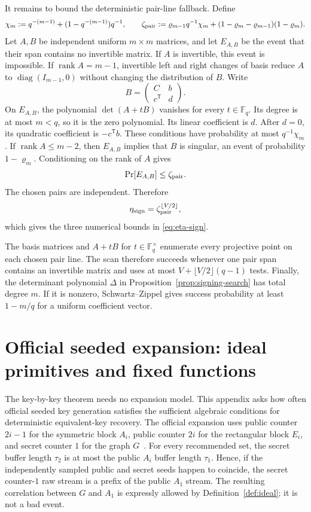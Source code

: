 \documentclass[11pt,a4paper]{article}
\theoremstyle{definition}
\theoremstyle{remark}
\newcommand{\F}{\mathbb F}
\newcommand{\rank}{\operatorname{rank}}
\begin{document}
It remains to bound the deterministic pair-line fallback.  Define
\begin{equation}\label{eq:app-pair-failure}
 \chi_m:=q^{-(m-1)}+(1-q^{-(m-1)})q^{-1},
 \qquad
 \zeta_{\rm pair}
 :=\varrho_{m-1}q^{-1}\chi_m
 +(1-\varrho_m-\varrho_{m-1})(1-\varrho_m).
\end{equation}
Let $A,B$ be independent uniform $m\times m$ matrices, and let $E_{A,B}$ be
the event that their span contains no invertible matrix.  If $A$ is
invertible, this event is impossible.  If $\rank A=m-1$, invertible left and
right changes of basis reduce $A$ to $\operatorname{diag}(I_{m-1},0)$ without
changing the distribution of $B$.  Write
\[
 B=\begin{pmatrix}C&b\\c^{\mathsf T}&d\end{pmatrix}.
\]
On $E_{A,B}$, the polynomial $\det(A+tB)$ vanishes for every $t\in\F_q$.
Its degree is at most $m<q$, so it is the zero polynomial.  Its linear
coefficient is $d$.  After $d=0$, its quadratic coefficient is
$-c^{\mathsf T}b$.  These conditions have probability at most
$q^{-1}\chi_m$.  If $\rank A\le m-2$, then $E_{A,B}$ implies that $B$ is
singular, an event of probability $1-\varrho_m$.  Conditioning on the rank of
$A$ gives
\[
 \Pr[E_{A,B}]\le\zeta_{\rm pair}.
\]
The chosen pairs are independent.  Therefore
\[
 \eta_{\rm sign}=\zeta_{\rm pair}^{\lfloor V/2\rfloor},
\]
which gives the three numerical bounds in \eqref{eq:eta-sign}.

The basis matrices and $A+tB$ for $t\in\F_q^\times$ enumerate every
projective point on each chosen pair line.  The scan therefore succeeds
whenever one pair span contains an invertible matrix and uses at most
$V+\lfloor V/2\rfloor(q-1)$ tests.  Finally, the determinant polynomial
$\Delta$ in Proposition~\ref{prop:signing-search} has total degree $m$.  If it is nonzero,
Schwartz--Zippel gives success probability at least $1-m/q$ for a uniform
coefficient vector.

\section{Official seeded expansion: ideal primitives and fixed functions}\label{app:seeded-transfer}

The key-by-key theorem needs no expansion model.  This appendix asks how often official seeded key generation satisfies the sufficient algebraic conditions for deterministic equivalent-key recovery.  The official expansion uses public counter $2i-1$ for the symmetric block $A_i$, public counter $2i$ for the rectangular block $E_i$, and secret counter $1$ for the graph $G$~\cite[Secs.~4.7--4.10]{QRUOVSpec}.  For every recommended set, the secret buffer length $\tau_2$ is at most the public $A_i$ buffer length $\tau_1$.  Hence, if the independently sampled public and secret seeds happen to coincide, the secret counter-$1$ raw stream is a prefix of the public $A_1$ stream.  The resulting correlation between $G$ and $A_1$ is expressly allowed by Definition~\ref{def:ideal}; it is not a bad event.
\end{document}
